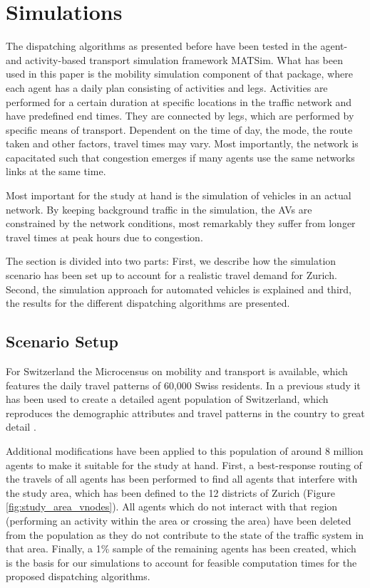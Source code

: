 \section{Simulations}
\label{sec:staticSimulations}

The dispatching algorithms as presented before have been tested in the agent-
and activity-based transport simulation framework MATSim. What has been used in
this paper is the mobility simulation component of that package, where each agent
has a daily plan consisting of activities and legs. Activities are performed for a
certain duration at specific locations in the traffic network and have predefined
end times. They are connected by legs, which are performed by specific means of
transport. Dependent on the time of day, the mode, the route taken and other factors,
travel times may vary. Most importantly, the network is capacitated such that
congestion emerges if many agents use the same networks links at the same time.

Most important for the study at hand is the simulation of vehicles in an actual
network. By keeping background traffic in the simulation, the AVs are constrained
by the network conditions, most remarkably they suffer from longer travel times
at peak hours due to congestion.

The section is divided into two parts: First, we describe how the simulation
scenario has been set up to account for a realistic travel demand for Zurich.
Second, the simulation approach for automated vehicles is explained and third,
the results for the different dispatching algorithms are presented.

\subsection{Scenario Setup}
\label{sec:simulations_scenario}

For Switzerland the Microcensus on mobility and transport \cite{microcensus} is
available, which features the daily travel patterns of 60,000 Swiss residents.
In a previous study it has been used to create a detailed agent population of
Switzerland, which reproduces the demographic attributes and travel patterns
in the country to great detail \cite{ivtbaseline}.

Additional modifications have been applied to this population of around 8 million
agents to make it suitable for the study at hand. First, a best-response routing
of the travels of all agents has been performed to find all agents that interfere
with the study area, which has been defined to the 12 districts of Zurich (Figure \ref{fig:study_area_vnodes}).
All agents which do not interact with that region (performing an activity within
the area or crossing the area) have been deleted from the population as they do
not contribute to the state of the traffic system in that area. Finally, a 1\%
sample of the remaining agents has been created, which is the basis for our
simulations to account for feasible computation times for the proposed dispatching
algorithms.

